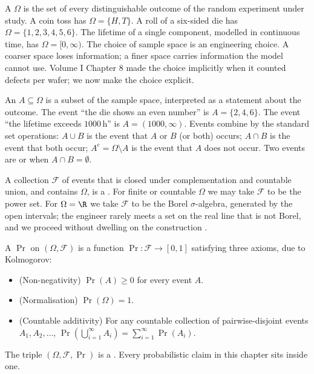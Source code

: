 A  $\Omega$ is the set of every distinguishable
outcome of the random experiment under study. A coin toss has
$\Omega = \{H, T\}$. A roll of a six-sided die has $\Omega =
\{1, 2, 3, 4, 5, 6\}$. The lifetime of a single component, modelled
in continuous time, has $\Omega = [0, \infty)$. The choice of sample
space is an engineering choice. A coarser space loses information;
a finer space carries information the model cannot use. Volume I
Chapter 8 made the choice implicitly when it counted defects per
wafer; we now make the choice explicit.

An  $A \subseteq \Omega$ is a subset of the sample
space, interpreted as a statement about the outcome. The event
``the die shows an even number'' is $A = \{2, 4, 6\}$. The event
``the lifetime exceeds $1000\,\text{h}$'' is $A = (1000, \infty)$.
Events combine by the standard set operations: $A \cup B$ is the
event that $A$ or $B$ (or both) occurs; $A \cap B$ is the event that
both occur; $A^{c} = \Omega \setminus A$ is the event that $A$ does
not occur. Two events are  or  when $A \cap B = \emptyset$.

A collection $\mathcal{F}$ of events that is closed under
complementation and countable union, and contains $\Omega$, is a
. For finite or countable $\Omega$ we may
take $\mathcal{F}$ to be the power set. For $\Omega = \R$ we take
$\mathcal{F}$ to be the Borel $\sigma$-algebra, generated by the
open intervals; the engineer rarely meets a set on the real line
that is not Borel, and we proceed without dwelling on the
construction \cite[appendix]{text:wasserman2004}.

A  $\Pr$ on $(\Omega, \mathcal{F})$ is
a function $\Pr : \mathcal{F} \to [0, 1]$ satisfying three axioms,
due to Kolmogorov:

\begin{itemize}[leftmargin=*]
  \item (Non-negativity) $\Pr(A) \geq 0$ for every event $A$.
  \item (Normalisation) $\Pr(\Omega) = 1$.
  \item (Countable additivity) For any countable collection of
    pairwise-disjoint events $A_{1}, A_{2}, \ldots$,
    $\Pr\left(\bigcup_{i=1}^{\infty} A_{i}\right) =
    \sum_{i=1}^{\infty} \Pr(A_{i})$.
\end{itemize}

The triple $(\Omega, \mathcal{F}, \Pr)$ is a . Every probabilistic claim in this chapter sits inside one.

